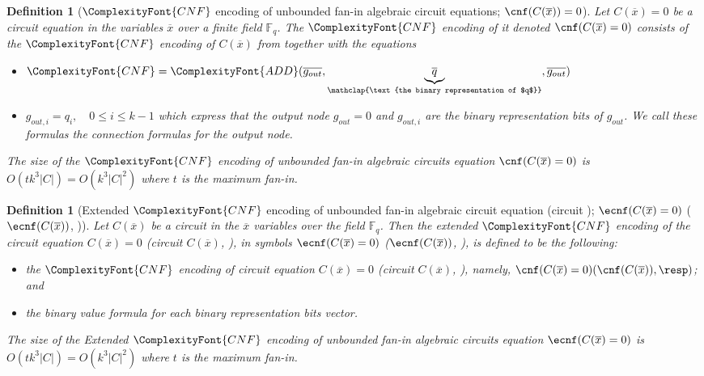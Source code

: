 \documentclass[11pt,letter]{article}
\newtheorem{definition}[theorem]{Definition}
\theoremstyle{remark} %
\newcommand{\CNF}{ %
    {
        \ComplexityFont{CNF}
    }
}
\newcommand{\add}{ %
    {
        \ComplexityFont{ADD}
    }
}
\begin{document}
{    \begin{definition}[$\CNF$ encoding of unbounded fan-in algebraic circuit equations; $\cnf(C(\overline{x}))=0$]
        \label{def: cnf encoding of algebraic circuit equations}
         Let $C(\overline{x})=0$ be a circuit equation in the variables $\overline{x}$ over a finite field $\mathbb{F}_q$. The $\CNF$ encoding of it denoted $\cnf(C(\overline{x})=0)$ consists of the $\CNF$ encoding of $C(\overline{x})$ from  together with the equations
        \begin{itemize}
            \item $\CNF=\add(\overline{g_{out}}, \underbrace{\overline{q}}_{\mathclap{\text{the binary representation of $q$}}}, \overline{g_{out}}) $
            \item $ g_{out,i} =q_i, \quad 0 \leq i \leq k-1$ which express that the output node $g_{out} = 0$ and $g_{out,i}$ are the binary representation bits of $g_{out}$. We call these formulas the connection formulas for the output node. 
        \end{itemize}
         The size of the $\CNF$ encoding of unbounded fan-in algebraic circuits equation $\cnf(C(\overline{x})=0)$ is $O(tk^3|C|)=O(k^3|C|^2)$ where $t$ is the maximum fan-in.
    \end{definition}
    \begin{definition}[Extended $\CNF$ encoding of unbounded fan-in algebraic circuit equation (circuit \resp); $\ecnf(C(\overline{x})=0)$ ($\ecnf(C(\overline{x}))$, \resp)]
        \label{def: ecnf encoding of algebraic circuit (equations)}
         Let $C(\overline{x})$ be a circuit in the $\overline{x}$ variables over the field $\mathbb{F}_q$. Then the extended $\CNF$ encoding of the circuit equation $C(\overline{x})=0$ (circuit $C(\overline{x})$, \resp), in symbols $\ecnf(C(\overline{x})=0)$ ($\ecnf(C(\overline{x}))$, \resp), is defined to be the following:
        \begin{itemize}
            \item the $\CNF$ encoding of circuit equation $C(\overline{x})=0$ (circuit $C(\overline{x})$, \resp), namely, $\cnf(C(\overline{x})=0) (\cnf(C(\overline{x})), \resp)$; and
            \item the binary value formula for each binary representation bits vector.
        \end{itemize}
        The size of the Extended $\CNF$ encoding of unbounded fan-in algebraic circuits equation $\ecnf(C(\overline{x})=0)$ is $O(tk^3|C|)=O(k^3|C|^2)$ where $t$ is the maximum fan-in.

\end{definition}}
\end{document}
